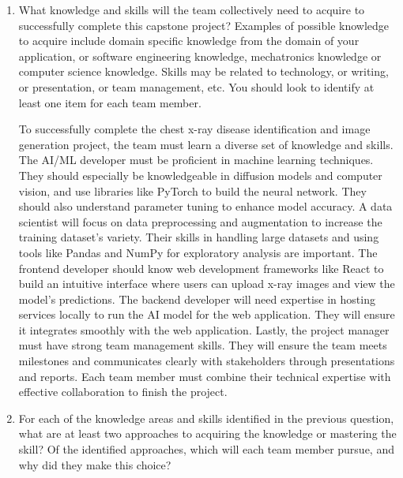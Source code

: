 \documentclass[12pt]{article}
\begin{document}
\begin{enumerate}
  \item What knowledge and skills will the team collectively need to acquire to
  successfully complete this capstone project?  Examples of possible knowledge
  to acquire include domain specific knowledge from the domain of your
  application, or software engineering knowledge, mechatronics knowledge or
  computer science knowledge.  Skills may be related to technology, or writing,
  or presentation, or team management, etc.  You should look to identify at
  least one item for each team member.

  To successfully complete the chest x-ray disease identification and image generation project, 
  the team must learn a diverse set of knowledge and skills. The AI/ML developer must be 
  proficient in machine learning techniques. They should especially be knowledgeable in diffusion 
  models and computer vision, and use libraries like PyTorch to build the neural network. They 
  should also understand parameter tuning to enhance model accuracy. A data scientist will focus 
  on data preprocessing and augmentation to increase the training dataset’s variety. Their skills 
  in handling large datasets and using tools like Pandas and NumPy for exploratory analysis are 
  important. The frontend developer should know web development frameworks like React to build an 
  intuitive interface where users can upload x-ray images and view the model’s predictions. The 
  backend developer will need expertise in hosting services locally to run the AI model for the 
  web application. They will ensure it integrates smoothly with the web application. Lastly, the 
  project manager must have strong team management skills. They will ensure the team meets 
  milestones and communicates clearly with stakeholders through presentations and reports. Each 
  team member must combine their technical expertise with effective collaboration to finish the 
  project.

  \item For each of the knowledge areas and skills identified in the previous
  question, what are at least two approaches to acquiring the knowledge or
  mastering the skill?  Of the identified approaches, which will each team
  member pursue, and why did they make this choice?


\end{enumerate}
\end{document}
